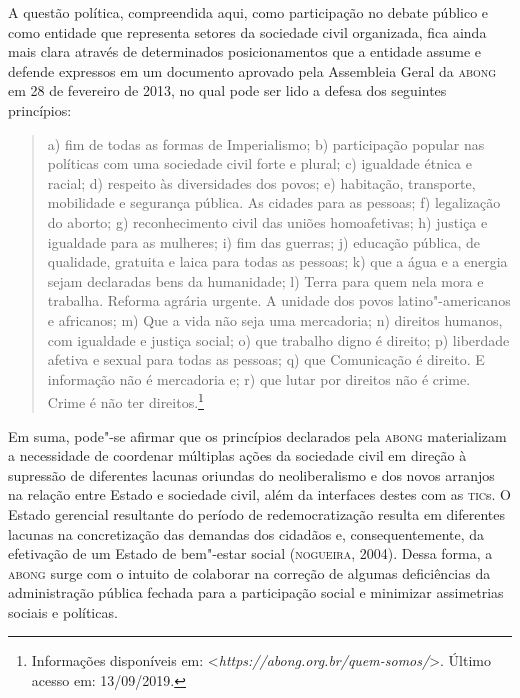 A questão política, compreendida aqui, como participação no debate
público e como entidade que representa setores da sociedade civil
organizada, fica ainda mais clara através de determinados
posicionamentos que a entidade assume e defende expressos em um
documento aprovado pela Assembleia Geral da \textsc{abong} em 28 de fevereiro de
2013, no qual pode ser lido a defesa dos seguintes princípios:

\begin{quote}
a) fim de todas as formas de Imperialismo; b) participação popular nas
políticas com uma sociedade civil forte e plural; c) igualdade étnica e
racial; d) respeito às diversidades dos povos; e) habitação, transporte,
mobilidade e segurança pública. As cidades para as pessoas; f)
legalização do aborto; g) reconhecimento civil das uniões homoafetivas;
h) justiça e igualdade para as mulheres; i) fim das guerras; j) educação
pública, de qualidade, gratuita e laica para todas as pessoas; k) que a
água e a energia sejam declaradas bens da humanidade; l) Terra para quem
nela mora e trabalha. Reforma agrária urgente. A unidade dos povos
latino"-americanos e africanos; m) Que a vida não seja uma mercadoria; n)
direitos humanos, com igualdade e justiça social; o) que trabalho digno
é direito; p) liberdade afetiva e sexual para todas as pessoas; q) que
Comunicação é direito. E informação não é mercadoria e; r) que lutar por
direitos não é crime. Crime é não ter direitos.\footnote{Informações
  disponíveis em:
  \textless{}\emph{https://abong.org.br/quem-somos/}\textgreater{}.
  Último acesso em: 13/09/2019.}
\end{quote}

Em suma, pode"-se afirmar que os princípios declarados pela \textsc{abong}
materializam a necessidade de coordenar múltiplas ações da sociedade
civil em direção à supressão de diferentes lacunas oriundas do
neoliberalismo e dos novos arranjos na relação entre Estado e sociedade
civil, além da interfaces destes com as \textsc{tic}s. O Estado gerencial
resultante do período de redemocratização resulta em diferentes lacunas
na concretização das demandas dos cidadãos e, consequentemente, da
efetivação de um Estado de bem"-estar social (\textsc{nogueira}, 2004). Dessa
forma, a \textsc{abong} surge com o intuito de colaborar na correção de algumas
deficiências da administração pública fechada para a participação social
e minimizar assimetrias sociais e políticas.

